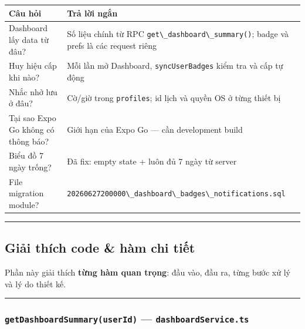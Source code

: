 \documentclass[12pt,a4paper]{article}
\newcounter{none}
\providecommand{\passthrough}[1]{#1}
\begin{document}
{\def\LTcaptype{none} %
\begin{longtable}[]{@{}
  >{\raggedright\arraybackslash}p{}
  >{\raggedright\arraybackslash}p{}@{}}
\toprule\noalign{}
\begin{minipage}[b]{\linewidth}\raggedright
Câu hỏi
\end{minipage} & \begin{minipage}[b]{\linewidth}\raggedright
Trả lời ngắn
\end{minipage} \\
\midrule\noalign{}
\endhead
\bottomrule\noalign{}
\endlastfoot
Dashboard lấy data từ đâu? & Số liệu chính từ RPC
\passthrough{\lstinline!get\_dashboard\_summary()!}; badge và prefs là
các request riêng \\
Huy hiệu cấp khi nào? & Mỗi lần mở Dashboard,
\passthrough{\lstinline!syncUserBadges!} kiểm tra và cấp tự động \\
Nhắc nhở lưu ở đâu? & Cờ/giờ trong \passthrough{\lstinline!profiles!};
id lịch và quyền OS ở từng thiết bị \\
Tại sao Expo Go không có thông báo? & Giới hạn của Expo Go --- cần
development build \\
Biểu đồ 7 ngày trống? & Đã fix: empty state + luôn đủ 7 ngày từ
server \\
File migration module? &
\passthrough{\lstinline!20260627200000\_dashboard\_badges\_notifications.sql!} \\
\end{longtable}
}

\begin{center}\rule{0.5\linewidth}{0.5pt}\end{center}

\subsection{Giải thích code \& hàm chi
tiết}\label{giux1ea3i-thuxedch-code-huxe0m-chi-tiux1ebft}

Phần này giải thích \textbf{từng hàm quan trọng}: đầu vào, đầu ra, từng
bước xử lý và lý do thiết kế.

\begin{center}\rule{0.5\linewidth}{0.5pt}\end{center}

\subsubsection{\texorpdfstring{\texttt{getDashboardSummary(userId)} ---
\texttt{dashboardService.ts}}{getDashboardSummary(userId) --- dashboardService.ts}}\label{getdashboardsummaryuserid-dashboardservice.ts}
\end{document}
